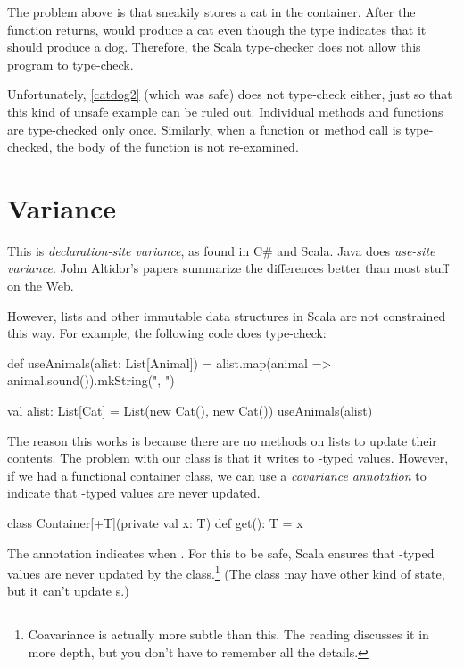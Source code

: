 \documentclass[9pt]{extbook}
\begin{document}
The problem above is that  sneakily stores a cat in
the container. After the function returns,  would produce
a cat even though the type indicates that it should produce a dog.
Therefore, the Scala type-checker does not allow this program to type-check.

Unfortunately, \cref{catdog2} (which was safe) does not type-check either, just so that
this kind of unsafe example can be ruled out. Individual methods and functions
are type-checked only once. Similarly, when a function or method call is type-checked,
the body of the function is not re-examined.

\section{Variance}

\begin{instructor}
This is \emph{declaration-site variance}, as found in C\# and Scala. Java
does \emph{use-site variance}. John Altidor's papers summarize the differences
better than most stuff on the Web.
\end{instructor}

However, lists and other immutable data structures in Scala are not constrained
this way. For example, the following code does type-check:

\begin{scalacode}
def useAnimals(alist: List[Animal]) = {
  alist.map(animal => animal.sound()).mkString(", ")
}

val alist: List[Cat] = List(new Cat(), new Cat())
useAnimals(alist)
\end{scalacode}

The reason this works is because there are no methods on lists to update
their contents. The problem with our  class is
that it writes to -typed values. However, if we had a functional
container class, we can use a \emph{covariance annotation} to indicate
that -typed values are never updated.

\begin{scalacode}
class Container[+T](private val x: T) {
  def get(): T = x
}
\end{scalacode}

The  annotation indicates  when . For this to be safe,
Scala ensures that -typed values are never updated
by the class.\footnote{Coavariance is actually more subtle than this. The reading discusses it in more depth, but you don't have to remember all the details.} (The class may have other kind of state, but it can't
update s.)
\end{document}
